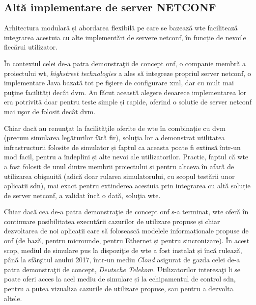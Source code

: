 \subsection{Altă implementare de server NETCONF}

Arhitectura modulară și abordarea flexibilă pe care se bazează \gls{wte} facilitează integrarea acestuia cu alte implementări de servere \gls{netconf}, în funcție de nevoile fiecărui utilizator.

În contextul celei de-a patra demonstraţii de concept \gls{onf}, o companie membră a proiectului \gls{wt}, \textit{highstreet technologies} a ales să integreze propriul server \gls{netconf}, o implementare Java bazată tot pe fişiere de configurare \gls{xml}, dar cu mult mai puţine facilități decât \gls{dvm}. Au făcut această alegere deoarece implementarea lor era potrivită doar pentru teste simple și rapide, oferind o soluție de server \gls{netconf} mai uşor de folosit decât \gls{dvm}.

Chiar dacă au renunţat la facilităţile oferite de \gls{wte} în combinație cu \gls{dvm} (precum simularea legăturilor fără fir), soluţia lor a demonstrat utilitatea infrastructurii folosite de simulator și faptul ca aceasta poate fi extinsă într-un mod facil, pentru a îndeplini și alte nevoi ale utilizatorilor. Practic, faptul că \gls{wte} a fost folosit de unul dintre membrii proiectului și pentru altceva în afară de utilizarea obişnuită (adică doar rularea simulatorului, cu scopul testării unor aplicații \gls{sdn}), mai exact pentru extinderea acestuia prin integrarea cu altă soluție de server \gls{netconf}, a validat încă o dată, soluţia \gls{wte}.

Chiar dacă cea de-a patra demonstraţie de concept \gls{onf} s-a terminat, \gls{wte} oferă în continuare posibilitatea executării cazurilor de utilizare propuse și chiar dezvoltarea de noi aplicații care să folosească modelele informaționale propuse de \gls{onf} (de bază, pentru microunde, pentru Ethernet și pentru sincronizare). În acest scop, mediul de simulare pus la dispoziţie de \gls{wte} a fost instalat și încă rulează, până la sfârşitul anului 2017, într-un mediu \textit{Cloud} asigurat de gazda celei de-a patra demonstraţii de concept, \textit{Deutsche Telekom}. Utilizatorilor interesaţi li se poate oferi acces la acel mediu de simulare și la echipamentul de control \gls{sdn}, pentru a putea vizualiza cazurile de utilizare propuse, sau pentru a dezvolta altele.